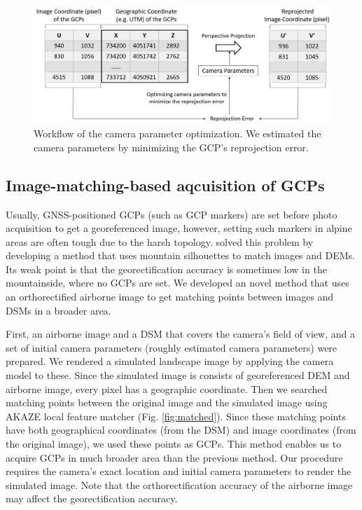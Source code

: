 \documentclass{article}
\begin{document}
\begin{figure}
\includegraphics[width=1\linewidth]{paper_files/figures/Slide5} \caption{Workflow of the camera parameter optimization. We estimated the camera parameters by minimizing the GCP's reprojection error.}\label{fig:optim}
\end{figure}

\hypertarget{image-matching-based-aqcuisition-of-gcps}{%
\subsection{Image-matching-based aqcuisition of GCPs}\label{image-matching-based-aqcuisition-of-gcps}}

Usually, GNSS-positioned GCPs (such as GCP markers) are set before photo acquisition to get a georeferenced image, however, setting such markers in alpine areas are often tough due to the harsh topology. \cite{Portenier2020Cryosphere} solved this problem by developing a method that uses mountain silhouettes to match images and DEMs. Its weak point is that the georectification accuracy is sometimes low in the mountainside, where no GCPs are set. We developed an novel method that uses an orthorectified airborne image to get matching points between images and DSMs in a broader area.

First, an airborne image and a DSM that covers the camera's field of view, and a set of initial camera parameters (roughly estimated camera parameters) were prepared. We rendered a simulated landscape image by applying the camera model to these. Since the simulated image is consists of georeferenced DEM and airborne image, every pixel has a geographic coordinate. Then we searched matching points between the original image and the simulated image using AKAZE local feature matcher (Fig. \ref{fig:matched}). Since these matching points have both geographical coordinates (from the DSM) and image coordinates (from the original image), we used these points as GCPs. This method enables us to acquire GCPs in much broader area than the previous method. Our procedure requires the camera's exact location and initial camera parameters to render the simulated image. Note that the orthorectification accuracy of the airborne image may affect the georectification accuracy.
\end{document}
